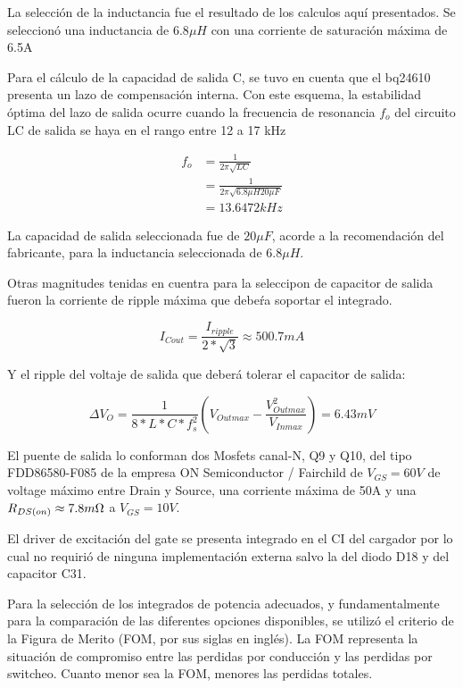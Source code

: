 \documentclass[10pt,a4paper]{article}
\begin{document}
La selección de la inductancia fue el resultado de los calculos aquí
presentados. Se seleccionó una inductancia de $6.8\mu H$ con una corriente de
saturación máxima de 6.5A

Para el cálculo de la capacidad de salida C, se tuvo en cuenta que el bq24610
presenta un lazo de compensación interna. Con este esquema, la estabilidad
óptima del lazo de salida ocurre cuando la frecuencia de resonancia $f_{o}$ del
circuito LC de salida se haya en el rango entre 12 a 17 kHz

\begin{align}
    f_{o}&=\frac{1}{2\pi \sqrt{LC}}\\
    &=\frac{1}{2\pi \sqrt{6.8\mu H 20\mu F}}\\
    &=13.6472 kHz
\end{align}

La capacidad de salida seleccionada fue de $20\mu F$, acorde a la recomendación
del fabricante, para la inductancia seleccionada de $6.8\mu H$. 

Otras magnitudes tenidas en cuentra para la seleccipon de capacitor de salida
fueron la corriente de ripple máxima que debeŕa soportar el integrado.

\begin{equation}
    I_{C out}=\frac{I_{ripple}}{2*\sqrt{3}}\approx 500.7mA
\end{equation}

Y el ripple del voltaje de salida que deberá tolerar el capacitor de salida: 

\begin{equation} 
    \Delta V_{O}=\frac{1}{8*L*C*f_{s}^{2}}(V_{Out max}-\frac{V_{Out
    max}^{2}}{V_{In max}})=6.43mV
\end{equation}

El puente de salida lo conforman dos Mosfets canal-N, Q9 y Q10, del tipo
FDD86580-F085 de la empresa ON Semiconductor / Fairchild de $V_{GS}=60V$ de
voltage máximo entre Drain y Source, una corriente máxima de 50A y una $R_{DS
(on)} \approx 7.8 m\ohm$ a $V_{GS} = 10V$. 

El driver de excitación del gate se presenta integrado en el \acrshort{CI} del
cargador por lo cual no requirió de ninguna implementación externa salvo la del
diodo D18 y del capacitor C31.

Para la selección de los integrados de potencia adecuados, y fundamentalmente
para la comparación de las diferentes opciones disponibles, se utilizó el
criterio de la Figura de Merito (\acrfull{FOM}, por sus siglas en inglés). La
\acrshort{FOM} representa la situación de compromiso entre las perdidas por
conducción y las perdidas por switcheo. Cuanto menor sea la \acrshort{FOM},
menores las perdidas totales. 
\end{document}
